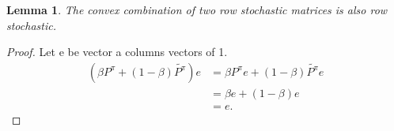 \documentclass{article}
\newtheorem{lemma}{Lemma}
\newcommand{\param}{\beta}
\newcommand{\pol}{\pi}
\begin{document}
\begin{lemma}
\label{lem:stochastic_matrix_convex_combination}
The convex combination of two row stochastic matrices is also row stochastic.
\end{lemma}
\begin{proof}
Let e be vector a columns vectors of 1.
\begin{equation}
\begin{split}
       (\param P^{\pol} + (1-\param) \widetilde{P^{\pol}})e &= \param P^{\pol}e +  (1-\param) \widetilde{P^{\pol}}e \\
       &= \param e + (1-\param) e\\
       &= e.
\end{split}
\end{equation}
\end{proof}
\end{document}

